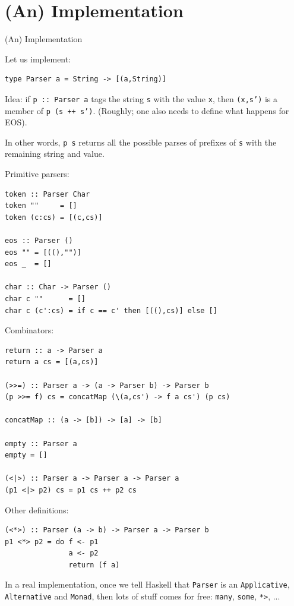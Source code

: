 \documentclass{beamer}
\newcommand{\titlecard}[1]{\begin{frame}\begin{center}\usebeamercolor[fg]{frametitle}\usebeamerfont{frametitle}#1\end{center}\end{frame}}
\begin{document}
\section{(An) Implementation}

\titlecard{(An) Implementation}

\begin{frame}[containsverbatim]
  Let us implement:
\begin{verbatim}
type Parser a = String -> [(a,String)]
\end{verbatim}

  \bigskip

  Idea: if \texttt{p :: Parser a} tags the string \texttt{s} with the
  value \texttt{x}, then \texttt{(x,s')} is a member of \texttt{p (s
    ++ s')}. (Roughly; one also needs to define what happens for EOS).

  \bigskip

  In other words, \texttt{p s} returns all the possible parses of
  prefixes of \texttt{s} with the remaining string and value.
\end{frame}

\begin{frame}[containsverbatim]
  Primitive parsers:
\begin{verbatim}
token :: Parser Char
token ""     = []
token (c:cs) = [(c,cs)]

eos :: Parser ()
eos "" = [((),"")]
eos _  = []

char :: Char -> Parser ()
char c ""      = []
char c (c':cs) = if c == c' then [((),cs)] else []
\end{verbatim}
\end{frame}

\begin{frame}[containsverbatim]
  Combinators:
\begin{verbatim}
return :: a -> Parser a
return a cs = [(a,cs)]

(>>=) :: Parser a -> (a -> Parser b) -> Parser b
(p >>= f) cs = concatMap (\(a,cs') -> f a cs') (p cs)

concatMap :: (a -> [b]) -> [a] -> [b]

empty :: Parser a
empty = []

(<|>) :: Parser a -> Parser a -> Parser a
(p1 <|> p2) cs = p1 cs ++ p2 cs
\end{verbatim}
\end{frame}

\begin{frame}[containsverbatim]
  Other definitions:

\begin{verbatim}
(<*>) :: Parser (a -> b) -> Parser a -> Parser b
p1 <*> p2 = do f <- p1
               a <- p2
               return (f a)
\end{verbatim}

\bigskip

In a real implementation, once we tell Haskell that \texttt{Parser} is
an \texttt{Applicative}, \texttt{Alternative} and \texttt{Monad}, then
lots of stuff comes for free: \texttt{many}, \texttt{some},
\texttt{*>}, ...
  
\end{frame}
\end{document}

